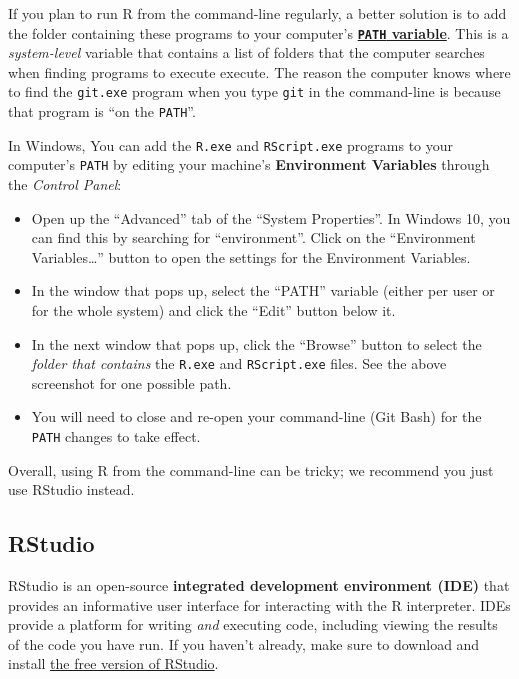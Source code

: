\documentclass[]{book}
\theoremstyle{definition}
\theoremstyle{definition}
\theoremstyle{remark}
\begin{document}
If you plan to run R from the command-line regularly, a better solution
is to add the folder containing these programs to your computer's
\href{https://en.wikipedia.org/wiki/PATH_(variable)}{\textbf{\texttt{PATH}
variable}}. This is a \emph{system-level} variable that contains a list
of folders that the computer searches when finding programs to execute
execute. The reason the computer knows where to find the
\texttt{git.exe} program when you type \texttt{git} in the command-line
is because that program is ``on the \texttt{PATH}''.

In Windows, You can add the \texttt{R.exe} and \texttt{RScript.exe}
programs to your computer's \texttt{PATH} by editing your machine's
\textbf{Environment Variables} through the \emph{Control Panel}:

\begin{itemize}
\item
  Open up the ``Advanced'' tab of the ``System Properties''. In Windows
  10, you can find this by searching for ``environment''. Click on the
  ``Environment Variables\ldots{}'' button to open the settings for the
  Environment Variables.
\item
  In the window that pops up, select the ``PATH'' variable (either per
  user or for the whole system) and click the ``Edit'' button below it.
\item
  In the next window that pops up, click the ``Browse'' button to select
  the \emph{folder that contains} the \texttt{R.exe} and
  \texttt{RScript.exe} files. See the above screenshot for one possible
  path.
\item
  You will need to close and re-open your command-line (Git Bash) for
  the \texttt{PATH} changes to take effect.
\end{itemize}

Overall, using R from the command-line can be tricky; we recommend you
just use RStudio instead.

\subsection{RStudio}\label{rstudio-1}

RStudio is an open-source \textbf{integrated development environment
(IDE)} that provides an informative user interface for interacting with
the R interpreter. IDEs provide a platform for writing \emph{and}
executing code, including viewing the results of the code you have run.
If you haven't already, make sure to download and install
\href{https://www.rstudio.com/products/rstudio/download3/\#download}{the
free version of RStudio}.
\end{document}
